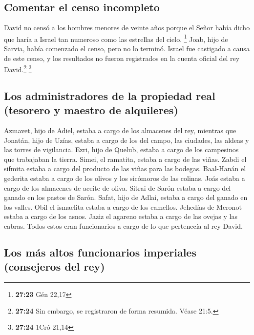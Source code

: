\hypertarget{comentar-el-censo-incompleto}{%
\subsection{Comentar el censo
incompleto}\label{comentar-el-censo-incompleto}}

 David no censó a los hombres menores de veinte años
porque el Señor había dicho que haría a Israel tan numeroso como las
estrellas del cielo. \footnote{\textbf{27:23} Gén 22,17} 
Joab, hijo de Sarvia, había comenzado el censo, pero no lo terminó.
Israel fue castigado a causa de este censo, y los resultados no fueron
registrados en la cuenta oficial del rey David.\footnote{\textbf{27:24}
  Sin embargo, se registraron de forma resumida. Véase 21:5.}
\footnote{\textbf{27:24} 1Cró 21,14}

\hypertarget{los-administradores-de-la-propiedad-real-tesorero-y-maestro-de-alquileres}{%
\subsection{Los administradores de la propiedad real (tesorero y maestro
de
alquileres)}\label{los-administradores-de-la-propiedad-real-tesorero-y-maestro-de-alquileres}}

 Azmavet, hijo de Adiel, estaba a cargo de los almacenes
del rey, mientras que Jonatán, hijo de Uzías, estaba a cargo de los del
campo, las ciudades, las aldeas y las torres de vigilancia.
 Ezri, hijo de Quelub, estaba a cargo de los campesinos
que trabajaban la tierra.  Simei, el ramatita, estaba a
cargo de las viñas. Zabdi el sifmita estaba a cargo del producto de las
viñas para las bodegas.  Baal-Hanán el gederita estaba a
cargo de los olivos y los sicómoros de las colinas. Joás estaba a cargo
de los almacenes de aceite de oliva.  Sitrai de Sarón
estaba a cargo del ganado en los pastos de Sarón. Safat, hijo de Adlai,
estaba a cargo del ganado en los valles.  Obil el
ismaelita estaba a cargo de los camellos. Jehedías de Meronot estaba a
cargo de los asnos.  Jaziz el agareno estaba a cargo de
las ovejas y las cabras. Todos estos eran funcionarios a cargo de lo que
pertenecía al rey David.

\hypertarget{los-muxe1s-altos-funcionarios-imperiales-consejeros-del-rey}{%
\subsection{Los más altos funcionarios imperiales (consejeros del
rey)}\label{los-muxe1s-altos-funcionarios-imperiales-consejeros-del-rey}}

